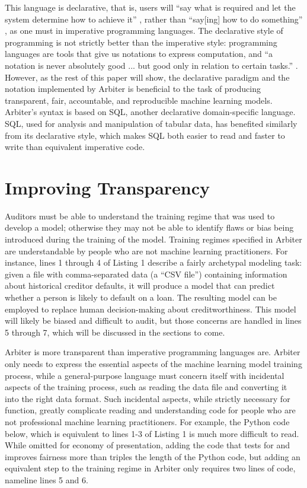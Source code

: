 \documentclass[letterpaper]{article}
\newcommand{\citep}[1]{\cite{#1}}
\begin{document}
This language is declarative, that is, users will ``say what is required and let the system determine how to achieve it'' \citep{Roy2004}, rather than ``say[ing] how to do something'' \citep{Roy2004}, as one must in imperative programming languages. The declarative style of programming is not strictly better than the imperative style: programming languages are tools that give us notations to express computation, and ``a notation is never absolutely good ... but good only in relation to certain tasks.'' \citep{Green1989}. However, as the rest of this paper will show, the declarative paradigm and the notation implemented by Arbiter is beneficial to the task of producing transparent, fair, accountable, and reproducible machine learning models. Arbiter's syntax is based on SQL, another declarative domain-specific language. SQL, used for analysis and manipulation of tabular data, has benefited similarly from its declarative style, which makes SQL both easier to read and faster to write than equivalent imperative code.

\section{Improving Transparency}	
Auditors must be able to understand the training regime that was used to develop a model; otherwise they may not be able to identify flaws or bias being introduced during the training of the model. Training regimes specified in Arbiter are understandable by people who are not machine learning practitioners. For instance, lines 1 through 4 of Listing 1 describe a fairly archetypal modeling task: given a file with comma-separated data (a ``CSV file'') containing information about historical creditor defaults, it will produce a model that can predict whether a person is likely to default on a loan. The resulting model can be employed to replace human decision-making about creditworthiness. This model will likely be biased and difficult to audit, but those concerns are handled in lines 5 through 7, which will be discussed in the sections to come.

Arbiter is more transparent than imperative programming languages are. Arbiter only needs to express the essential aspects of the machine learning model training process, while a general-purpose language must concern itself with incidental aspects of the training process, such as reading the data file and converting it into the right data format. Such incidental aspects, while strictly necessary for function, greatly complicate reading and understanding code for people who are not professional machine learning practitioners. For example, the Python code below, which is equivalent to lines 1-3 of Listing 1 is much more difficult to read. While omitted for economy of presentation, adding the code that tests for and improves fairness more than triples the length of the Python code, but adding an equivalent step to the training regime in Arbiter only requires two lines of code, nameline lines 5 and 6.
\end{document}
